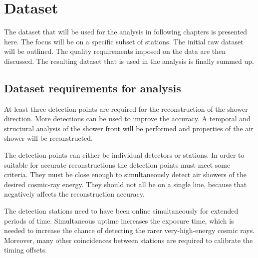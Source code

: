 \chapter{Dataset}
\label{ch:dataset}


The dataset that will be used for the analysis in following chapters is presented here. The focus will be on a specific subset of stations. The initial raw dataset will be outlined. The quality requirements imposed on the data are then discussed. The resulting dataset that is used in the analysis is finally summed up.


\section{Dataset requirements for analysis}

At least three detection points are required for the reconstruction of the shower direction. More detections can be used to improve the accuracy. A temporal and structural analysis of the shower front will be performed and properties of the air shower will be reconstructed.

The detection points can either be individual \hisparc detectors or \hisparc stations. In order to suitable for accurate reconstructions the detection points must meet some criteria. They must be close enough to simultaneously detect air showers of the desired cosmic-ray energy. They should not all be on a single line, because that negatively affects the reconstruction accuracy.

The detection stations need to have been online simultaneously for extended periods of time. Simultaneous uptime increases the exposure time, which is needed to increase the chance of detecting the rarer very-high-energy cosmic rays. Moreover, many other coincidences between stations are required to calibrate the timing offsets.

